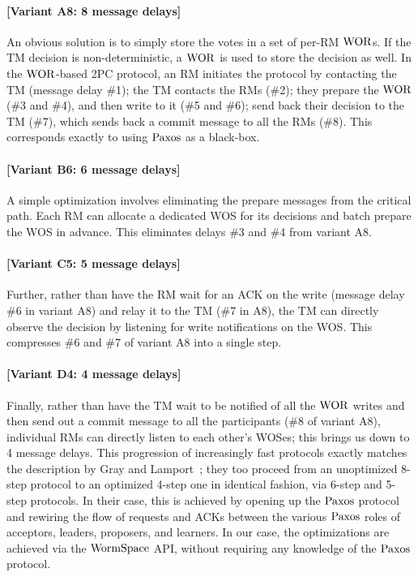\paragraph{[Variant A8: 8 message delays]} An obvious solution is to simply store the votes in a set of per-RM $\mathrm{WOR}$s. 
If the TM decision is non-deterministic, a $\mathrm{WOR}$ is used to store the decision as well. In the $\mathrm{WOR}$-based 2PC protocol, 
an RM initiates the protocol by contacting the TM (message delay \#1); the TM contacts the RMs (\#2); 
they prepare the $\mathrm{WOR}$ (\#3 and \#4), and then write to it (\#5 and \#6); send back their decision to the TM (\#7), 
which sends back a commit message to all the RMs (\#8). This corresponds exactly to using $\mathrm{Paxos}$ as a black-box.

\paragraph{[Variant B6: 6 message delays]} A simple optimization involves eliminating the prepare messages from the critical path. 
Each RM can allocate a dedicated WOS for its decisions and batch prepare the WOS in advance. 
This eliminates delays \#3 and \#4 from variant A8.%


\paragraph{[Variant C5: 5 message delays]} Further, rather than have the RM wait for an ACK on the write (message delay \#6 in variant A8) and 
relay it to the TM (\#7 in A8), the TM can directly observe the decision by listening for write notifications on the WOS. 
This compresses \#6 and \#7 of variant A8 into a single step.


\paragraph{[Variant D4: 4 message delays]} Finally, rather than have the TM wait to be notified of all the $\mathrm{WOR}$ 
writes and then send out a commit message to all the participants (\#8 of variant A8), 
individual RMs can directly listen to each other's WOSes; this brings us down to 4 message delays.
This progression of increasingly fast protocols exactly matches the description by Gray and Lamport~\cite{gray:2006}; 
they too proceed from an unoptimized 8-step protocol to an optimized 4-step one in identical fashion, via 6-step and 5-step protocols. 
In their case, this is achieved by opening up the $\mathrm{Paxos}$ protocol and rewiring the flow of requests and ACKs between the various 
$\mathrm{Paxos}$ roles of acceptors, leaders, proposers, and learners. In our case, the optimizations are achieved via the $\mathrm{WormSpace}$ API, 
without requiring any knowledge of the $\mathrm{Paxos}$ protocol.

